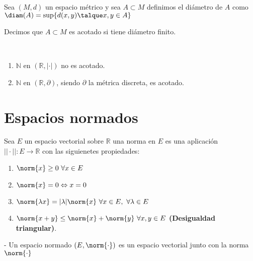 		
	\begin{defi}
		 Sea $(M,d)$ un espacio m\'etrico y sea $A \subset M $ definimos el diámetro de $A$ como $\diam(A)=\sup\{d(x,y)\talque x,y \in A\}$
	\end{defi}
	
	\begin{defi}
		Decimos que $A\subset M$ es acotado si tiene di\'ametro finito.\\
	\end{defi}
	
	\begin{ejem} \
		\begin{enumerate}[1)]
			\item $\mathbb{N}$ en $(\mathbb{R},|\cdot|)$ no es acotado.
			\item $\mathbb{N}$ en $(\mathbb{R},\partial)$, siendo $\partial$ la métrica discreta, es acotado.
		\end{enumerate} 
	\end{ejem}
	
	\section{Espacios normados}	
	
	\begin{defi}
		Sea $E$ un espacio vectorial sobre $\mathbb{R}$ una norma en $E$ es una aplicaci\'on \\ $||\cdot||\colon E \to \mathbb{R}$ con las siguienetes propiedades:
		\begin{enumerate}
			\item $\norm{x} \geq 0 \ \forall x \in E$
			\item $\norm{x} = 0 \Leftrightarrow x=0$
			\item $\norm{\lambda x} = |\lambda| \norm{x} \ \forall x\in E, \ \forall \lambda\in E$
			\item $\norm{x+y} \leq \norm{x} + \norm{y} \ \forall x,y \in E$ \textbf{(Desigualdad triangular)}.		
		\end{enumerate}
	\end{defi}
	
	\begin{nota}
	- Un espacio normado $(E,\norm{\cdot})$ es un espacio vectorial junto con la norma $\norm{\cdot}$
	\end{nota}
	
